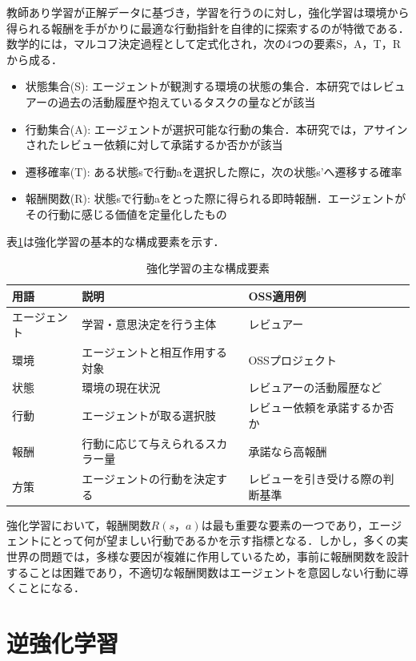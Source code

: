 \documentclass[11pt]{jreport}
\begin{document}
教師あり学習が正解データに基づき，学習を行うのに対し，強化学習は環境から得られる報酬を手がかりに最適な行動指針を自律的に探索するのが特徴である．
数学的には，マルコフ決定過程として定式化され，次の4つの要素S，A，T，Rから成る．
\begin{itemize}
    \item 状態集合(S): エージェントが観測する環境の状態の集合．本研究ではレビュアーの過去の活動履歴や抱えているタスクの量などが該当
    \item 行動集合(A): エージェントが選択可能な行動の集合．本研究では，アサインされたレビュー依頼に対して承諾するか否かが該当
    \item 遷移確率(T): ある状態sで行動aを選択した際に，次の状態s'へ遷移する確率
    \item 報酬関数(R): 状態sで行動aをとった際に得られる即時報酬．エージェントがその行動に感じる価値を定量化したもの
\end{itemize}
表\ref{tab:RL}は強化学習の基本的な構成要素を示す．
\begin{table}[h]
\centering
\caption{強化学習の主な構成要素}
\label{tab:RL} 
\begingroup 
\setlength{\tabcolsep}{4pt} 
\footnotesize 
    \begin{tabularx}{\columnwidth}{lXX} 
    \toprule
    用語 & 説明 & OSS適用例 \\
    \midrule
    エージェント & 学習・意思決定を行う主体 & レビュアー \\
    環境 & エージェントと相互作用する対象 & OSSプロジェクト \\
    状態 & 環境の現在状況 & レビュアーの活動履歴など \\
    行動 & エージェントが取る選択肢 & レビュー依頼を承諾するか否か \\
    報酬 & 行動に応じて与えられるスカラー量 & 承諾なら高報酬 \\
    方策 & エージェントの行動を決定する & レビューを引き受ける際の判断基準 \\
    \bottomrule
    \end{tabularx}
\endgroup
\end{table}

強化学習において，報酬関数$R(s，a)$は最も重要な要素の一つであり，エージェントにとって何が望ましい行動であるかを示す指標となる．しかし，多くの実世界の問題では，多様な要因が複雑に作用しているため，事前に報酬関数を設計することは困難であり，不適切な報酬関数はエージェントを意図しない行動に導くことになる．

\section{逆強化学習}
\end{document}

